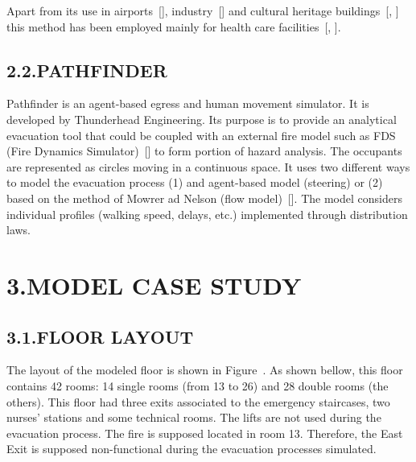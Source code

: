 \documentclass{style/llncs}
\begin{document}
Apart from its use in airports~[], industry~[] and cultural
heritage buildings~[, ] this method has been employed mainly for
health care facilities~[, ].%

\subsection{2.2.\hspace*{0.5em}PATHFINDER}\label{sec-pathfinder}%

\noindent{}Pathfinder is an agent-based egress and human movement simulator. It is
developed by Thunderhead Engineering. Its purpose is to provide an
analytical evacuation tool that could be coupled with an external fire
model such as FDS (Fire Dynamics Simulator)~[] to form portion of
hazard analysis. The occupants are represented as circles moving in a
continuous space. It uses two different ways to model the evacuation
process (1) and agent-based model (steering) or (2) based on the method
of Mowrer ad Nelson (flow model)~[]. The model considers individual
profiles (walking speed, delays, etc.) implemented through
distribution laws.%

\section{3.\hspace*{0.5em}MODEL CASE STUDY}\label{sec-model-case-study}%

\subsection{3.1.\hspace*{0.5em}FLOOR LAYOUT}\label{sec-floor-layout}%

\noindent{}The layout of the modeled floor is shown in Figure~. As
shown bellow, this floor contains 42 rooms: 14 single rooms (from
13 to 26) and 28 double rooms (the others). This floor had three exits
associated to the emergency staircases, two nurses' stations and some
technical rooms. The lifts are not used during the evacuation process.
The fire is supposed located in room 13. Therefore, the East Exit is
supposed non-functional during the evacuation processes simulated.%
\end{document}
